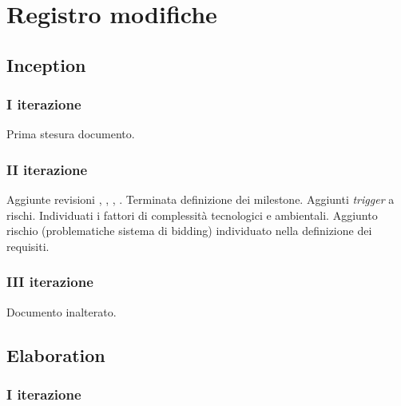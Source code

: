 \documentclass[10pt]{softeng}
\begin{document}
\startofdocument

\clearpage





\clearpage



\clearpage



\clearpage



\clearpage

\section{Registro modifiche}

\subsection{Inception}

\subsubsection{I iterazione}

Prima stesura documento.

\subsubsection{II iterazione}

Aggiunte revisioni , , , .
Terminata definizione dei milestone.
Aggiunti \emph{trigger} a rischi.
Individuati i fattori di complessit\`a tecnologici e ambientali.
Aggiunto rischio  (problematiche sistema di bidding) individuato nella definizione dei requisiti.

\subsubsection{III iterazione}

Documento inalterato.

\subsection{Elaboration}

\subsubsection{I iterazione}
\end{document}
